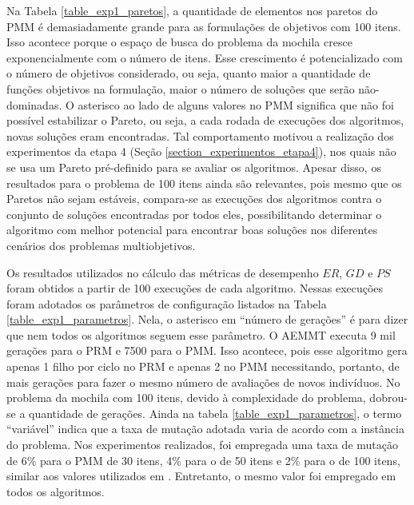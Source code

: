 Na Tabela \ref{table_exp1_paretos}, a quantidade de elementos nos paretos do PMM é demasiadamente grande para as formulações de objetivos com 100 itens. Isso acontece porque o espaço de busca do problema da mochila cresce exponencialmente com o número de itens. Esse crescimento é potencializado com o número de objetivos considerado, ou seja, quanto maior a quantidade de funções objetivos na formulação, maior o número de soluções que serão não-dominadas. O asterisco ao lado de alguns valores no PMM significa que não foi possível estabilizar o Pareto, ou seja, a cada rodada de execuções dos algoritmos, novas soluções eram encontradas. Tal comportamento motivou a realização dos experimentos da etapa 4 (Seção \ref{section_experimentos_etapa4}), nos quais não se usa um Pareto pré-definido para se avaliar os algoritmos. Apesar disso, os resultados para o problema de 100 itens ainda são relevantes, pois mesmo que os Paretos não sejam estáveis, compara-se as execuções dos algoritmos contra o conjunto de soluções encontradas por todos eles, possibilitando determinar o algoritmo com melhor potencial para encontrar boas soluções nos diferentes cenários dos problemas multiobjetivos.

Os resultados utilizados no cálculo das métricas de desempenho $ER$, $GD$ e $PS$ foram obtidos a partir de 100 execuções de cada algoritmo. Nessas execuções foram adotados os parâmetros de configuração listados na Tabela \ref{table_exp1_parametros}. Nela, o asterisco em ``número de gerações'' é para dizer que nem todos os algoritmos seguem esse parâmetro. O AEMMT executa 9 mil gerações para o PRM e 7500 para o PMM. Isso acontece, pois esse algoritmo gera apenas 1 filho por ciclo no PRM e apenas 2 no PMM necessitando, portanto, de mais gerações para fazer o mesmo número de avaliações de novos indivíduos. No problema da mochila com 100 itens, devido à complexidade do problema, dobrou-se a quantidade de gerações. Ainda na tabela \ref{table_exp1_parametros}, o termo ``variável'' indica que a taxa de mutação adotada varia de acordo com a instância do problema. Nos experimentos realizados, foi empregada uma taxa de mutação de 6\% para o PMM de 30 itens, 4\% para o de 50 itens e 2\% para o de 100 itens, similar aos valores utilizados em \cite{Ishibuchi2015}. Entretanto, o mesmo valor foi empregado em todos os algoritmos.

